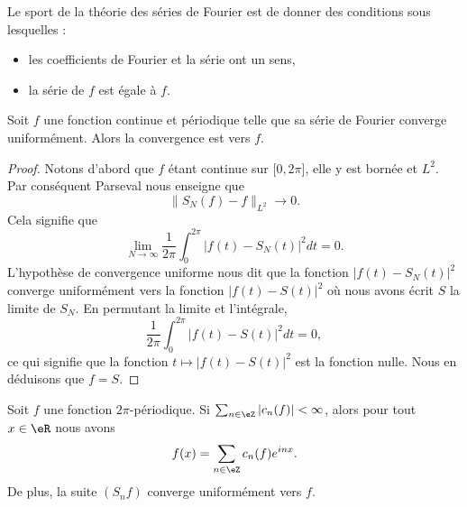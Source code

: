 Le sport de la théorie des séries de Fourier est de donner des conditions sous lesquelles :
\begin{itemize}
    \item les coefficients de Fourier et la série ont un sens,
    \item la série de \( f\) est égale à \( f\).
\end{itemize}

\begin{proposition}  \label{PropmrLfGt}
    Soit \( f\) une fonction continue et périodique telle que sa série de Fourier converge uniformément. Alors la convergence est vers \( f\).
\end{proposition}

\begin{proof}
    Notons d'abord que \( f\) étant continue sur \(\mathopen[ 0 , 2\pi \mathclose]\), elle y est bornée et \( L^2\). Par conséquent Parseval nous enseigne que
    \begin{equation}
        \| S_N(f)-f \|_{L^2}\to 0.
    \end{equation}
    Cela signifie que
    \begin{equation}
        \lim_{N\to \infty} \frac{1}{ 2\pi }\int_{0}^{2\pi}| f(t)-S_N(t) |^2dt=0.
    \end{equation}
    L'hypothèse de convergence uniforme nous dit que la fonction \( | f(t)-S_N(t) |^2\) converge uniformément vers la fonction \( | f(t)-S(t) |^2\) où nous avons écrit \( S\) la limite de \( S_N\). En permutant la limite et l'intégrale,
    \begin{equation}
        \frac{1}{ 2\pi }\int_0^{2\pi}| f(t)-S(t) |^2dt=0,
    \end{equation}
    ce qui signifie que la fonction \( t\mapsto | f(t)-S(t) |^2\) est la fonction nulle. Nous en déduisons que \( f=S\).
\end{proof}

\begin{proposition}     \label{PropSgvPab}
    Soit \( f\) une fonction \( 2\pi\)-périodique. Si \( \sum_{n\in \eZ}| c_n(f) |<\infty\), alors pour tout \( x\in \eR\) nous avons
    \begin{equation}
        f(x)=\sum_{n\in \eZ}c_n(f) e^{inx}.
    \end{equation}
    De plus, la suite \( (S_nf)\) converge uniformément vers \( f\).
\end{proposition}

